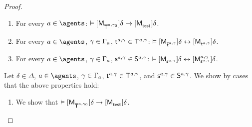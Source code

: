 \begin{proof}
\begin{enumerate}
    \item For every $\agentA \in \agents$: $\entails \actionA{\aPModel{\aPStatesT[\agentA, \gamma_0]}} \delta \implies \actionA{\aPModel{\aStateTest}} \delta$.
    \item For every $\agentA \in \agents$, $\gamma \in \Gamma_\agentA$, $\aStateT[\agentA, \gamma] \in \aStatesT[\agentA, \gamma]$: $\entails \actionA{\aPModel{\aPStateT[\agentA, \gamma]}} \delta \iff \actionA{\aPModel{\aStateT[\agentA, \gamma]}} \delta$.
    \item For every $\agentA \in \agents$, $\gamma \in \Gamma_\agentA$, $\aStateS[\agentA, \gamma] \in \aStates[\agentA, \gamma]$: $\entails \actionA{\aPModel{\aStateS[\agentA, \gamma]}} \delta \iff \actionA{\aPModel[\agentA, \gamma]{\aStateS[\agentA, \gamma]}} \delta$.
\end{enumerate}

Let $\delta \in \Delta$, $\agentA \in \agents$, $\gamma \in \Gamma_\agentA$, $\aStateT[\agentA, \gamma] \in \aStatesT[\agentA, \gamma]$, and $\aStateS[\agentA, \gamma] \in \aStates[\agentA, \gamma]$.
We show by cases that the above properties hold:

\begin{enumerate}
    \item We show that $\entails \actionA{\aPModel{\aPStatesT[\agentA, \gamma_0]}} \delta \implies \actionA{\aPModel{\aStateTest}} \delta$.


\end{enumerate}
\end{proof}

